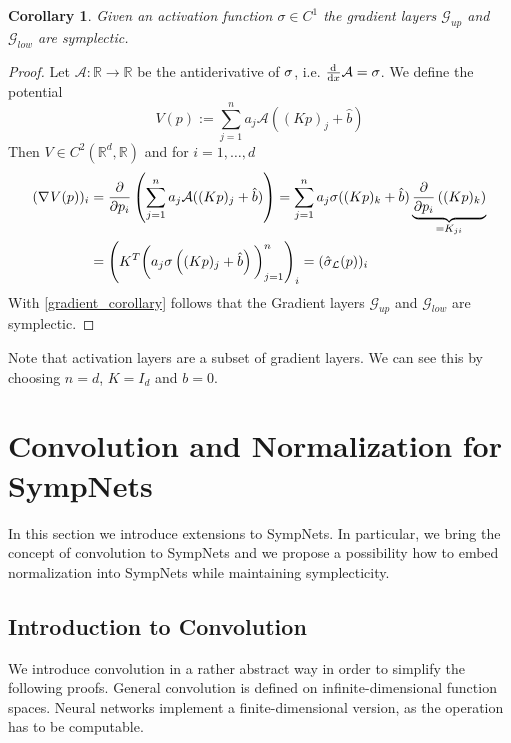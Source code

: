 \documentclass[twoside,a4paper]{article}
\newtheorem{corollary}{Corollary}
\begin{document}
\begin{corollary}
	Given an activation function $\sigma \in C^1$ the gradient layers $\mathcal{G}_{up}$
	and $\mathcal{G}_{low}$ are symplectic.
\end{corollary}
\begin{proof}
	Let $\mathcal{A}: \mathbb{R} \to \mathbb{R}$ be the antiderivative of $\sigma$, 
	i.e. $\frac{\mathrm{d}^{}}{\mathrm{d}x} \mathcal{A} = \sigma$. We define the potential
	\begin{equation*}
		V(p) := \sum_{j=1}^n a_j \mathcal{A}((Kp)_j + \hat{b})
	\end{equation*}
	Then $V \in C^2(\mathbb{R}^d, \mathbb{R})$ and for $i=1, \dots, d$
	\begin{align*}
		(\nabla_{}{V(p)})_i &= \frac{\partial }{\partial p_i} \left( \sum_{j=1}^n a_j \mathcal{A}((Kp)_j + \hat{b}) \right)
		= \sum_{j=1}^n a_j \sigma((Kp)_k + \hat{b}) 
		\underbrace{\frac{\partial }{\partial p_i} \left( (Kp)_k \right)}_{=K_{ji}} \\
		&= \left( K^T \bigg( a_j \sigma \left( (Kp)_j + \hat{b} \right) \bigg)_{j=1}^n \right)_i
		= (\hat{\sigma}_{\mathcal{L}}(p))_i
	\end{align*}
	With \cref{gradient_corollary} follows that the Gradient layers
	$\mathcal{G}_{up}$ and $\mathcal{G}_{low}$ are symplectic.
\end{proof}

Note that activation layers are a subset of gradient layers. We can see this by choosing
$n=d$, $K=I_d$ and $b=0$.

\section{Convolution and Normalization for SympNets}

In this section we introduce extensions to SympNets. In particular, we bring the concept
of convolution to SympNets and we propose a possibility how to embed normalization into SympNets while
maintaining symplecticity.

\subsection{Introduction to Convolution}


We introduce convolution in a rather abstract way in order to simplify the following proofs.
General convolution is defined on infinite-dimensional function spaces.
Neural networks implement a finite-dimensional version, as the operation has to be
computable.
\end{document}
